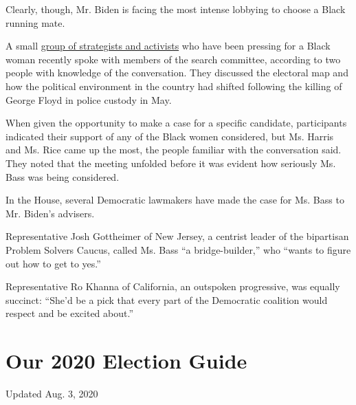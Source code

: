 Clearly, though, Mr. Biden is facing the most intense lobbying to choose
a Black running mate.

A small
\href{https://www.nytimes.com/2020/06/10/us/politics/joe-biden-black-vice-president.html}{group
of strategists and activists} who have been pressing for a Black woman
recently spoke with members of the search committee, according to two
people with knowledge of the conversation. They discussed the electoral
map and how the political environment in the country had shifted
following the killing of George Floyd in police custody in May.

When given the opportunity to make a case for a specific candidate,
participants indicated their support of any of the Black women
considered, but Ms. Harris and Ms. Rice came up the most, the people
familiar with the conversation said. They noted that the meeting
unfolded before it was evident how seriously Ms. Bass was being
considered.

In the House, several Democratic lawmakers have made the case for Ms.
Bass to Mr. Biden's advisers.

Representative Josh Gottheimer of New Jersey, a centrist leader of the
bipartisan Problem Solvers Caucus, called Ms. Bass ``a bridge-builder,''
who ``wants to figure out how to get to yes.''

Representative Ro Khanna of California, an outspoken progressive, was
equally succinct: ``She'd be a pick that every part of the Democratic
coalition would respect and be excited about.''

\hypertarget{our-2020-election-guide}{%
\section{Our 2020 Election Guide}\label{our-2020-election-guide}}

Updated Aug. 3, 2020

